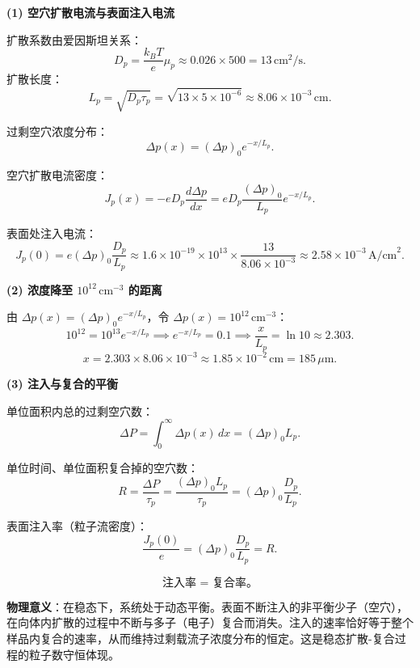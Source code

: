 \begin{derivationbox}[标准解题过程]
\textbf{(1) 空穴扩散电流与表面注入电流}

扩散系数由爱因斯坦关系：
\[
D_p=\frac{k_BT}{e}\mu_p\approx0.026\times500=13\,\text{cm}^2/\text{s}.
\]
扩散长度：
\[
L_p=\sqrt{D_p\tau_p}=\sqrt{13\times5\times10^{-6}}\approx8.06\times10^{-3}\,\text{cm}.
\]

过剩空穴浓度分布：
\[
\Delta p(x)=(\Delta p)_0e^{-x/L_p}.
\]

空穴扩散电流密度：
\[
J_p(x)=-eD_p\frac{d\Delta p}{dx}=eD_p\frac{(\Delta p)_0}{L_p}e^{-x/L_p}.
\]

表面处注入电流：
\begin{equation}
\boxed{J_p(0)=e(\Delta p)_0\frac{D_p}{L_p}\approx1.6\times10^{-19}\times10^{13}\times\frac{13}{8.06\times10^{-3}}\approx2.58\times10^{-3}\,\text{A/cm}^2.}
\end{equation}

\textbf{(2) 浓度降至 $10^{12}\,\text{cm}^{-3}$ 的距离}

由 $\Delta p(x)=(\Delta p)_0e^{-x/L_p}$，令 $\Delta p(x)=10^{12}\,\text{cm}^{-3}$：
\[
10^{12}=10^{13}e^{-x/L_p}\implies e^{-x/L_p}=0.1\implies\frac{x}{L_p}=\ln10\approx2.303.
\]
\begin{equation}
\boxed{x=2.303\times8.06\times10^{-3}\approx1.85\times10^{-2}\,\text{cm}=185\,\mu\text{m}.}
\end{equation}

\textbf{(3) 注入与复合的平衡}

单位面积内总的过剩空穴数：
\[
\Delta P=\int_0^\infty\Delta p(x)\,dx=(\Delta p)_0L_p.
\]

单位时间、单位面积复合掉的空穴数：
\[
R=\frac{\Delta P}{\tau_p}=\frac{(\Delta p)_0L_p}{\tau_p}=(\Delta p)_0\frac{D_p}{L_p}.
\]

表面注入率（粒子流密度）：
\[
\frac{J_p(0)}{e}=(\Delta p)_0\frac{D_p}{L_p}=R.
\]

\begin{equation}
\boxed{\text{注入率 = 复合率。}}
\end{equation}

\textbf{物理意义}：在稳态下，系统处于动态平衡。表面不断注入的非平衡少子（空穴），在向体内扩散的过程中不断与多子（电子）复合而消失。注入的速率恰好等于整个样品内复合的速率，从而维持过剩载流子浓度分布的恒定。这是稳态扩散-复合过程的粒子数守恒体现。
\end{derivationbox}

